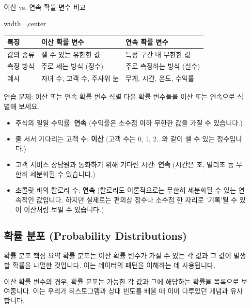 \documentclass[11pt,a4paper]{article}
\theoremstyle{definition}
\begin{document}
\begin{infobox}{이산 vs. 연속 확률 변수 비교}
\begin{adjustbox}{width=\textwidth,center}
\begin{tabular}{lll}
\toprule
\textbf{특징} & \textbf{이산 확률 변수} & \textbf{연속 확률 변수} \\
\midrule
값의 종류 & 셀 수 있는 유한한 값 & 특정 구간 내 무한한 값 \\
측정 방식 & 주로 세는 방식 (정수) & 주로 측정하는 방식 (실수) \\
예시 & 자녀 수, 고객 수, 주사위 눈 & 무게, 시간, 온도, 수익률 \\
\bottomrule
\end{tabular}
\end{adjustbox}
\end{infobox}

\begin{examplebox}{연습 문제: 이산 또는 연속 확률 변수 식별}
다음 확률 변수들을 이산 또는 연속으로 식별해 보세요.
\begin{itemize}
    \item 주식의 일일 수익률: \textbf{연속} (수익률은 소수점 이하 무한한 값을 가질 수 있습니다.)
    \item 줄 서서 기다리는 고객 수: \textbf{이산} (고객 수는 0, 1, 2...와 같이 셀 수 있는 정수입니다.)
    \item 고객 서비스 상담원과 통화하기 위해 기다린 시간: \textbf{연속} (시간은 초, 밀리초 등 무한히 세분화될 수 있습니다.)
    \item 초콜릿 바의 칼로리 수: \textbf{연속} (칼로리도 이론적으로는 무한히 세분화될 수 있는 연속적인 값입니다. 하지만 실제로는 편의상 정수나 소수점 한 자리로 '기록'될 수 있어 이산처럼 보일 수 있습니다.)
\end{itemize}
\end{examplebox}

\newpage
\subsection{확률 분포 (Probability Distributions)}

\begin{summarybox}{확률 분포 핵심 요약}
확률 분포는 이산 확률 변수가 가질 수 있는 각 값과 그 값이 발생할 확률을 나열한 것입니다. 이는 데이터의 패턴을 이해하는 데 사용됩니다.
\end{summarybox}

이산 확률 변수의 경우, 확률 분포는 가능한 각 값과 그에 해당하는 확률을 목록으로 보여줍니다. 이는 우리가 히스토그램과 상대 빈도를 배울 때 이미 다루었던 개념과 유사합니다.
\end{document}

